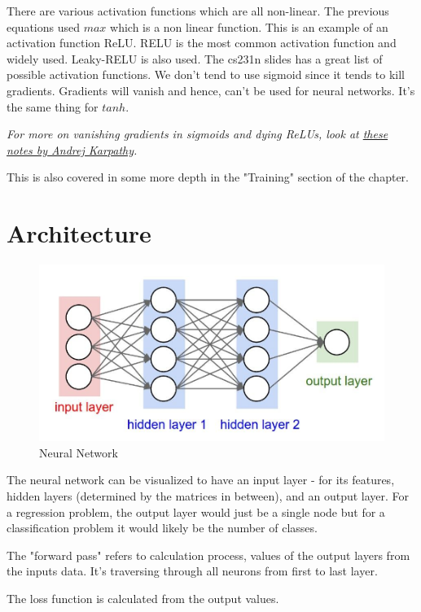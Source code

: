 There are various activation functions which are all non-linear. The previous equations used $max$ which is a non linear function. This is an example of an activation function ReLU. RELU is the most common activation function and widely used. Leaky-RELU is also used. The cs231n slides has a great list of possible activation functions. We don't tend to use sigmoid since it tends to kill gradients. Gradients will vanish and hence, can't be used for neural networks. It's the same thing for $tanh$.

\textit{For more on vanishing gradients in sigmoids and dying ReLUs, look at \href{https://medium.com/@karpathy/yes-you-should-understand-backprop-e2f06eab496b}{these notes by Andrej Karpathy}.}

This is also covered in some more depth in the "Training" section of the chapter.

\section{Architecture}

\begin{figure}[h]
    \centering
    \includegraphics{img/Neural Network.png}
    \caption{Neural Network}
    \label{fig:neural-network}
\end{figure}

The neural network can be visualized to have an input layer - for its features, hidden layers (determined by the matrices in between), and an output layer. For a regression problem, the output layer would just be a single node but for a classification problem it would likely be the number of classes.

The "forward pass" refers to calculation process, values of the output layers from the inputs data. It's traversing through all neurons from first to last layer.

The loss function is calculated from the output values. 

